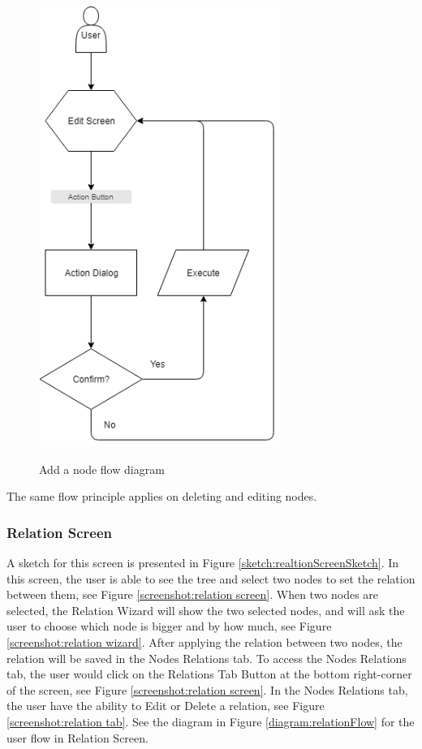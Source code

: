 \documentclass[11pt]{article} %
\begin{document}
\begin{figure}
  \caption{Add a node flow diagram}
  \centering
  \includegraphics[width=0.7\textwidth]{editScreenAction}
  \label{diagram:editScreenAction}
\end{figure}

\noindent
The same flow principle applies on deleting and editing nodes.

\subsubsection{Relation Screen}\label{relation screen}
A sketch for this screen is presented in Figure \ref{sketch:realtionScreenSketch}. In this screen, the user is able to see the tree and select two nodes to set the relation between them, see Figure \ref{screenshot:relation screen}. When two nodes are selected, the Relation Wizard will show the two selected nodes, and will ask the user to choose which node is bigger and by how much, see Figure \ref{screenshot:relation wizard}. After applying the relation between two nodes, the relation will be saved in the Nodes Relations tab. To access the Nodes Relations tab, the user would click on the Relations Tab Button at the bottom right-corner of the screen, see Figure \ref{screenshot:relation screen}.
In the Nodes Relations tab, the user have the ability to Edit or Delete a relation, see Figure \ref{screenshot:relation tab}. See the diagram in Figure \ref{diagram:relationFlow} for the user flow in Relation Screen.
\end{document}
